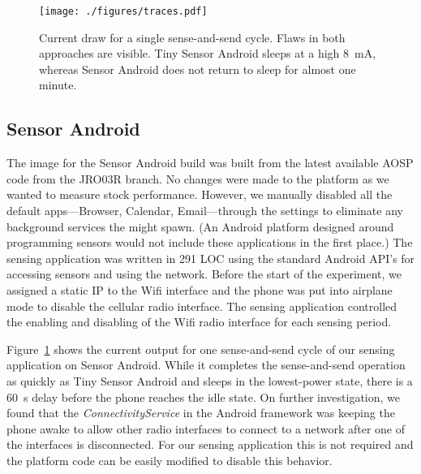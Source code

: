 \begin{figure}[t]
\texttt{[image: ./figures/traces.pdf]}

\caption{\small Current draw for a single sense-and-send cycle.
\textnormal{Flaws in both approaches are visible. Tiny Sensor Android sleeps
at a high 8~mA, whereas Sensor Android does not return to sleep for almost
one minute.}}

\label{fig-traces}
\end{figure}


\subsection{Sensor Android}
\label{subsec-full}

The image for the Sensor Android build was built from the latest available
AOSP code from the JRO03R branch. No changes were made to the platform as we
wanted to measure stock performance. However, we manually disabled all the
default apps---Browser, Calendar, Email---through the settings to eliminate
any background services the might spawn. (An Android platform designed around
programming sensors would not include these applications in the first place.)
The sensing application was written in 291 LOC using the standard Android
API's for accessing sensors and using the network. Before the start of the
experiment, we assigned a static IP to the Wifi interface and the phone was
put into airplane mode to disable the cellular radio interface. The sensing
application controlled the enabling and disabling of the Wifi radio interface
for each sensing period.

Figure~\ref{fig-traces} shows the current output for one sense-and-send cycle
of our sensing application on Sensor Android. While it completes the
sense-and-send operation as quickly as Tiny Sensor Android and sleeps in the
lowest-power state, there is a 60~s delay before the phone reaches the idle
state. On further investigation, we found that the
\textit{ConnectivityService} in the Android framework was keeping the phone
awake to allow other radio interfaces to connect to a network after one of
the interfaces is disconnected. For our sensing application this is not
required and the platform code can be easily modified to disable this
behavior.

